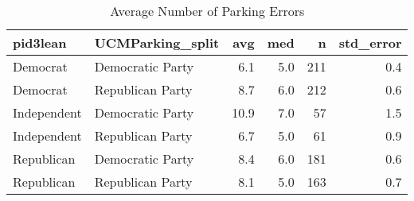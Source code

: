 \begin{table}[!htb]
\centering
\caption{Average Number of Parking Errors} 
\label{tab:parking_sum}
\begin{tabular}{llrrrr}
  \hline
pid3lean & UCMParking\_split & avg & med & n & std\_error \\ 
  \hline
Democrat     & Democratic Party & 6.1 & 5.0 & 211 & 0.4 \\ 
  Democrat     & Republican Party & 8.7 & 6.0 & 212 & 0.6 \\ 
  Independent  & Democratic Party & 10.9 & 7.0 & 57 & 1.5 \\ 
  Independent  & Republican Party & 6.7 & 5.0 & 61 & 0.9 \\ 
  Republican   & Democratic Party & 8.4 & 6.0 & 181 & 0.6 \\ 
  Republican   & Republican Party & 8.1 & 5.0 & 163 & 0.7 \\ 
   \hline
\end{tabular}
\end{table}

